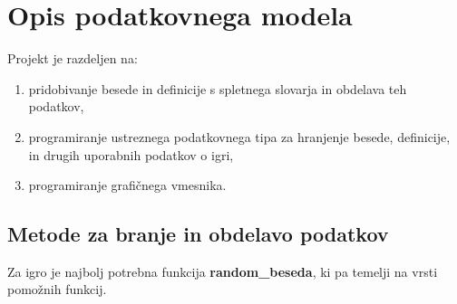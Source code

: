 \documentclass [a4paper, 12pt] {article}
\begin{document}
\section {Opis podatkovnega modela}
Projekt je razdeljen na:
\begin {enumerate}
\item pridobivanje besede in definicije s spletnega slovarja in obdelava teh podatkov,
\item programiranje ustreznega podatkovnega tipa za hranjenje besede, definicije, in drugih uporabnih podatkov o igri,
\item programiranje grafičnega vmesnika.
\end {enumerate}

\subsection {Metode za branje in obdelavo podatkov}
Za igro je najbolj potrebna funkcija \textbf {random\_beseda}, ki pa temelji na vrsti pomožnih funkcij.
\end{document}
